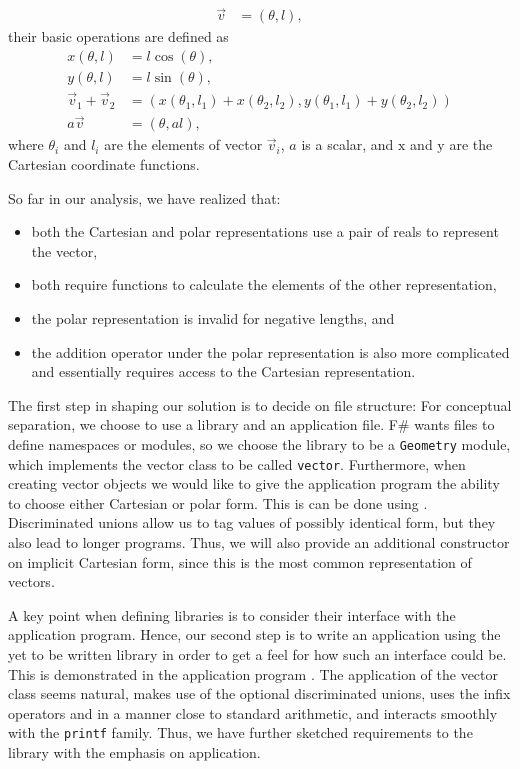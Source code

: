 \documentclass[fsharpNotes.tex]{subfiles}
\begin{document}
\begin{align}
  \vec v &= (\theta,l),
\end{align}
their basic operations are defined as
\begin{align}
  x(\theta,l) &= l\cos(\theta),
  \\y(\theta,l) &= l\sin(\theta),
  \\\vec v_1 + \vec v_2 &= (x(\theta_1,l_1)+x(\theta_2,l_2), y(\theta_1,l_1)+y(\theta_2,l_2))
  \\a\vec v &= (\theta,a l),
\end{align}
where $\theta_i$ and $l_i$ are the elements of vector $\vec v_i$, $a$ is a scalar, and $\text{x}$ and $\text{y}$ are the Cartesian coordinate functions.

So far in our analysis, we have realized that:
\begin{itemize}
\item both the Cartesian and polar representations use a pair of reals to represent the vector, 
\item both require functions to calculate the elements of the other representation, 
\item the polar representation is invalid for negative lengths, and
\item the addition operator under the polar representation is also more complicated and essentially requires access to the Cartesian representation.
\end{itemize}
 

The first step in shaping our solution is to decide on file structure: For conceptual separation, we choose to use a library and an application file. F\# wants files to define namespaces or modules, so we choose the library to be a \lstinline{Geometry} module, which implements the vector class to be called \lstinline{vector}. Furthermore, when creating vector objects we would like to give the application program the ability to choose either Cartesian or polar form. This is can be done using . Discriminated unions allow us to tag values of possibly identical form, but they also lead to longer programs. Thus, we will also provide an additional constructor on implicit Cartesian form, since this is the most common representation of vectors.

A key point when defining libraries is to consider their interface with the application program. Hence, our second step is to write an application using the yet to be written library in order to get a feel for how such an interface could be. This is demonstrated in the application program .
%
%
The application of the vector class seems natural, makes use of the optional discriminated unions, uses the infix operators \lexeme{+} and \lexeme{*} in a manner close to standard arithmetic, and interacts smoothly with the \lstinline{printf} family. Thus, we have further sketched requirements to the library with the emphasis on application.
\end{document}
